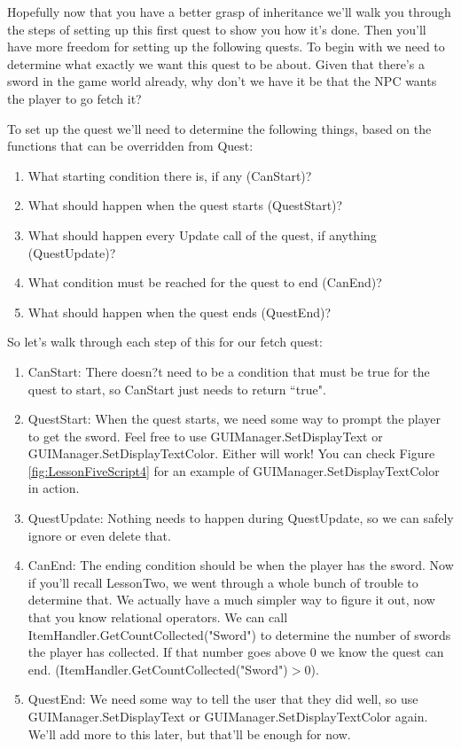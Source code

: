 \documentclass{article}
\begin{document}
Hopefully now that you have a better grasp of inheritance we'll walk you through the steps of setting up this first quest to show you how it's done. Then you'll have more freedom for setting up the following quests. To begin with we need to determine what exactly we want this quest to be about. Given that there's a sword in the game world already, why don't we have it be that the NPC wants the player to go fetch it? 

To set up the quest we'll need to determine the following things, based on the functions that can be overridden from Quest: 

\begin{enumerate}
 \item What starting condition there is, if any (CanStart)?
 \item What should happen when the quest starts (QuestStart)?
 \item What should happen every Update call of the quest, if anything (QuestUpdate)?
 \item What condition must be reached for the quest to end (CanEnd)?
 \item What should happen when the quest ends (QuestEnd)?
\end{enumerate}

So let's walk through each step of this for our fetch quest: 

\begin{enumerate}
 \item CanStart: There doesn?t need to be a condition that must be true for the quest to start, so CanStart just needs to return ``true".
 \item QuestStart: When the quest starts, we need some way to prompt the player to get the sword. Feel free to use GUIManager.SetDisplayText or GUIManager.SetDisplayTextColor. Either will work! You can check Figure \ref{fig:LessonFiveScript4} for an example of GUIManager.SetDisplayTextColor in action.
 \item QuestUpdate: Nothing needs to happen during QuestUpdate, so we can safely ignore or even delete that.
 \item CanEnd: The ending condition should be when the player has the sword. Now if you'll recall LessonTwo, we went through a whole bunch of trouble to determine that. We actually have a much simpler way to figure it out, now that you know relational operators. We can call ItemHandler.GetCountCollected("Sword") to determine the number of swords the player has collected. If that number goes above 0 we know the quest can end. (ItemHandler.GetCountCollected("Sword")$>$0).
 \item QuestEnd: We need some way to tell the user that they did well, so use GUIManager.SetDisplayText or GUIManager.SetDisplayTextColor again. We'll add more to this later, but that'll be enough for now.
\end{enumerate}
\end{document}

